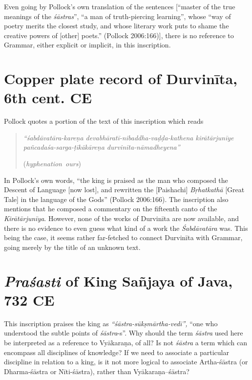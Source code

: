 Even going by Pollock's own translation of the sentences [``master of the true meanings of the {\sl śāstras}'', ``a man of truth-piercing learning'', whose ``way of poetry merits the closest study, and whose literary work puts to shame the creative powers of [other] poets.'' (Pollock 2006:166)], there is no reference to Grammar, either explicit or implicit, in this inscription.

\section{Copper plate record of Durvinīta, 6th cent. CE}\label{chap3-sec3}

Pollock quotes a portion of the text of this inscription which reads 
\begin{quote}
{{\sl ``śabdāvatāra-kareṇa devabhāratī-nibaddha-vaḍḍa-kathena kirātārjunīye pañ\-ca\-daśa-sarga-ṭīkākāreṇa durvinīta-nāmadheyena''}} 

\hfill \hbox{({\sl hyphenation ours})}
\end{quote}

In Pollock's own words, ``the king is praised as the man who composed the Descent of Language [now lost], and rewritten the [Paishachi] {\sl Bṛhatkathā} [Great Tale] in the language of the Gods'' (Pollock 2006:166). The inscription also mentions that he composed a commentary on the fifteenth canto of the {\sl Kirātārjunīya}. However, none of the works of Durvinīta are now available, and there is no evidence to even guess what kind of a work the {\sl Śabdāvatāra} was. This being the case, it seems rather far-fetched to connect Durvinīta with Grammar, going merely by the title of an unknown text. 

\section{{\sl\bfseries Praśasti} of King Sañjaya of Java, 732 CE}\label{chap3-sec4}

This inscription praises the king as {\sl ``śāstra-sūkṣmārtha-vedī'',} ``one who understood the subtle points of {\sl śāstra}-s''. Why should the term {\sl śāstra} used here be interpreted as a reference to Vyākaraṇa, of all? Is not {\sl śāstra} a term which can encompass all disciplines of knowledge? If we need to associate a particular discipline in relation to a king, is it not more logical to associate Artha-śāstra (or Dharma-śāstra or Nīti-śāstra), rather than Vyākaraṇa--śāstra?

